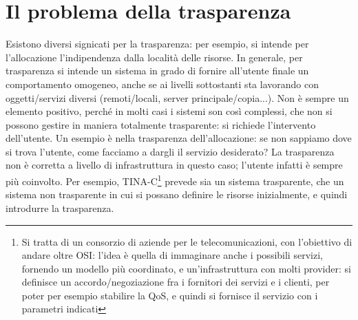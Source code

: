 \section{Il problema della trasparenza}
Esistono diversi signicati per la trasparenza: per esempio, si intende per l'allocazione l'indipendenza dalla località
delle risorse. In generale, per trasparenza si intende un sistema in grado di fornire all'utente finale un comportamento
omogeneo, anche se ai livelli sottostanti sta lavorando con oggetti/servizi diversi (remoti/locali, server
principale/copia...).
Non è sempre un elemento positivo, perché in molti casi i sistemi son così complessi, che non si possono gestire in
maniera totalmente trasparente: si richiede l'intervento dell'utente. Un esempio è nella trasparenza dell'allocazione:
se non sappiamo dove si trova l'utente, come facciamo a dargli il servizio desiderato? La trasparenza non è corretta
a livello di infrastruttura in questo caso; l'utente infatti è sempre più coinvolto.
Per esempio, TINA-C\footnote{Si tratta di un consorzio di aziende per le telecomunicazioni, con l'obiettivo di andare
oltre OSI: l'idea è quella di immaginare anche i possibili servizi, fornendo un modello più coordinato, e
un'infrastruttura con molti provider: si definisce un accordo/negoziazione fra i fornitori dei servizi e i clienti,
per poter per esempio stabilire la QoS, e quindi si fornisce il servizio con i parametri indicati} prevede sia un
sistema trasparente, che un sistema non trasparente in cui si possano definire le risorse inizialmente, e quindi
introdurre la trasparenza.
